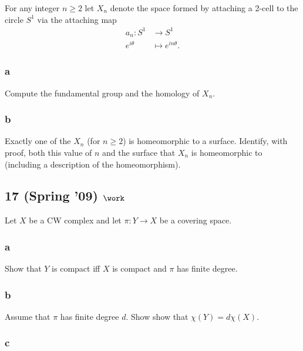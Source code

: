 For any integer \(n \geq 2\) let \(X_n\) denote the space formed by
attaching a 2-cell to the circle \(S^1\) via the attaching map
\begin{align*}  
a_n: S^1 &\to S^1 \\
e^{i\theta} &\mapsto e^{in\theta}
.\end{align*}

\hypertarget{a-1}{%
\subsubsection{a}\label{a-1}}

Compute the fundamental group and the homology of \(X_n\).

\hypertarget{b-1}{%
\subsubsection{b}\label{b-1}}

Exactly one of the \(X_n\) (for \(n \geq 2\)) is homeomorphic to a
surface. Identify, with proof, both this value of \(n\) and the surface
that \(X_n\) is homeomorphic to (including a description of the
homeomorphism).

\hypertarget{spring-09-work-2}{%
\subsection{\texorpdfstring{17 (Spring '09)
\(\work\)}{17 (Spring '09) \textbackslash work}}\label{spring-09-work-2}}

Let \(X\) be a CW complex and let \(\pi : Y \to X\) be a covering space.

\hypertarget{a-2}{%
\subsubsection{a}\label{a-2}}

Show that \(Y\) is compact iff \(X\) is compact and \(\pi\) has finite
degree.

\hypertarget{b-2}{%
\subsubsection{b}\label{b-2}}

Assume that \(\pi\) has finite degree \(d\). Show show that
\(\chi (Y ) = d \chi (X)\).

\hypertarget{c}{%
\subsubsection{c}\label{c}}

